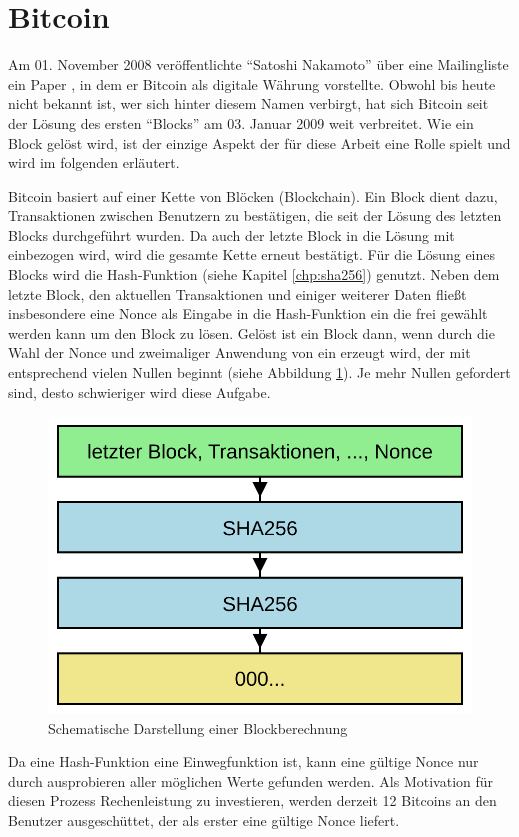 \section{Bitcoin}
\label{sec:bitcoin}

Am 01. November 2008 veröffentlichte "`Satoshi Nakamoto"' über eine Mailingliste \cite{bitcoinmailinglist} ein Paper \cite{bitcoinpaper}, in dem
er Bitcoin als digitale Währung vorstellte. Obwohl bis heute nicht bekannt ist, wer sich hinter diesem Namen verbirgt, hat sich Bitcoin seit der
Lösung des ersten "`Blocks"' am 03. Januar 2009 \cite{bitcoinblock0} weit verbreitet. Wie ein Block gelöst wird, ist der einzige Aspekt der für
diese Arbeit eine Rolle spielt und wird im folgenden erläutert.

Bitcoin basiert auf einer Kette von Blöcken (Blockchain). Ein Block dient dazu, Transaktionen zwischen Benutzern zu bestätigen, die seit der Lösung
des letzten Blocks durchgeführt wurden. Da auch der letzte Block in die Lösung mit einbezogen wird, wird die gesamte Kette erneut bestätigt.
Für die Lösung eines Blocks wird die Hash-Funktion  (siehe Kapitel \ref{chp:sha256}) genutzt. Neben dem letzte Block, den aktuellen Transaktionen und einiger
weiterer Daten fließt insbesondere eine Nonce als Eingabe in die Hash-Funktion ein die frei gewählt werden kann um den Block zu lösen. Gelöst ist ein
Block dann, wenn durch die Wahl der Nonce und zweimaliger Anwendung von  ein  erzeugt wird, der mit entsprechend vielen Nullen beginnt
(siehe Abbildung \ref{fig:bitcoin}). Je mehr Nullen gefordert sind, desto schwieriger wird diese Aufgabe.

\begin{figure}[!h]
  \centering
  \includegraphics[scale=0.4]{images/bitcoin}
  \caption{Schematische Darstellung einer Blockberechnung}
  \label{fig:bitcoin}
\end{figure}

Da eine Hash-Funktion eine Einwegfunktion ist, kann eine gültige Nonce nur durch ausprobieren aller möglichen Werte gefunden werden. Als Motivation
für diesen Prozess Rechenleistung zu investieren, werden derzeit 12 Bitcoins an den Benutzer ausgeschüttet, der als erster eine gültige Nonce liefert.



